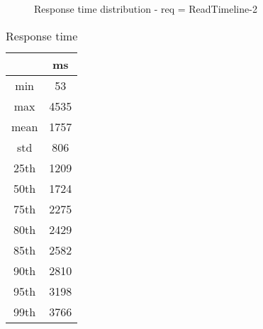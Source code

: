 \begin{minipage}{0.75\linewidth}
\begin{figure}[h]
\begin{adjustbox}{max width=1.0\linewidth, keepaspectratio}
  \end{adjustbox}
  \caption{Response time distribution - req = ReadTimeline-2}
\end{figure}
\end{minipage}\hfill\begin{minipage}{0.18\linewidth}
\begin{table}[h]
\begin{tabular}{|cc|}
\hline
\textbf{} & \textbf{ms}\\ \hline
 \Xhline{0.005\arrayrulewidth}
min & 53\\
 \Xhline{0.005\arrayrulewidth}
max & 4535\\
 \Xhline{0.005\arrayrulewidth}
mean & 1757\\
 \Xhline{0.005\arrayrulewidth}
std & 806\\
\hline
\hline
 \Xhline{0.005\arrayrulewidth}
25th & 1209\\
 \Xhline{0.005\arrayrulewidth}
50th & 1724\\
 \Xhline{0.005\arrayrulewidth}
75th & 2275\\
 \Xhline{0.005\arrayrulewidth}
80th & 2429\\
 \Xhline{0.005\arrayrulewidth}
85th & 2582\\
 \Xhline{0.005\arrayrulewidth}
90th & 2810\\
 \Xhline{0.005\arrayrulewidth}
95th & 3198\\
 \Xhline{0.005\arrayrulewidth}
99th & 3766\\
\hline
\end{tabular}
\caption{Response time}
\end{table}
\end{minipage}\hfill